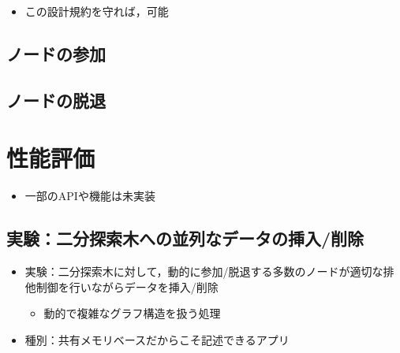 \documentclass[25pt,landscape,papersize]{jsarticle}
\begin{document}

\begin{itemize}
\item この設計規約を守れば，可能
\end{itemize}


\subsection{ノードの参加}


\subsection{ノードの脱退}


\section{性能評価}

\begin{itemize}
\item 一部のAPIや機能は未実装
\end{itemize}

\subsection{実験：二分探索木への並列なデータの挿入/削除}

\begin{itemize}
\item 実験：二分探索木に対して，動的に参加/脱退する多数のノードが適切な排他制御を行いながらデータを挿入/削除
  \begin{itemize}
  \item 動的で複雑なグラフ構造を扱う処理
  \end{itemize}
\item 種別：共有メモリベースだからこそ記述できるアプリ
\end{itemize}
\end{document}
